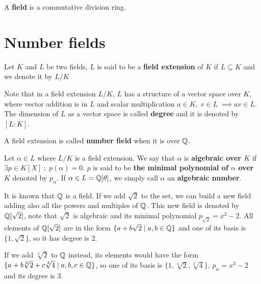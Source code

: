 \documentclass[Ingles]{ic-tese-v3}
\begin{document}
\begin{definition}
  A \textbf{field} is a commutative division ring.
\end{definition}

\section{Number  fields}
\label{sec:orgd6953d3}

   \begin{definition}
  Let $K$ and $L$ be two fields, $L$ is said to be a \textbf{field extension} of
  $K$ if $L \subseteq K$ and we denote it by $L/K$
\end{definition}

Note that in a field extension \(L/K\), \(L\) has a structure of a vector space over
\(K\), where vector addition is in \(L\) and scalar multiplication \(a \in K, \; v \in L
   \; \implies av \in L\). The dimension of \(L\) as a vector space is called
\textbf{degree} and it is denoted by \([L:K]\).

\begin{definition}
  A field extension is called \textbf{number field} when it is over $\mathbb{Q}$.
\end{definition}

\begin{definition}
  Let $\alpha \in L$ where $L/K$ is a field extension. We say that $\alpha$ is
  \textbf{algebraic over $K$} if $\exists p \in K[X] \;;\; p(\alpha) = 0$. $p$ is said to be
  \textbf{the minimal polynomial of $\alpha$ over $K$} denoted by $p_\alpha$. If $\alpha \in L =
  \mathbb{Q}[\theta]$, we simply call $\alpha$ an \textbf{algebraic number}.
\end{definition}

\begin{example}
  It is known that $\mathbb{Q}$ is a field. If we add $\sqrt{2}$ to the set, we
  can build a new field adding also all the powers and multiples of
  $\mathbb{Q}$. This new field is denoted by $\mathbb{Q}[\sqrt{2}]$, note that
  $\sqrt{2}$ is algebraic and its minimal polynomial $p_{\sqrt{2}} = x^2-2$. All
  elements of $\mathbb{Q}[\sqrt{2}]$ are in the form $\{a+b\sqrt{2} \;|\; a,b \in
  \mathbb{Q}\}$ and one of its basis is $\{1, \sqrt{2}\}$, so it has degree is
  $2$.
\end{example}

\begin{example}
  If we add $\sqrt[3]{2}$ to $\mathbb{Q}$ instead, its elements would have the
  form $\{a + b\sqrt[3]{2} + c\sqrt[3]{4} \;|\; a,b,c \in \mathbb{Q}\}$, so one of
  its basis is $\{1 ,\sqrt[3]{2} ,\sqrt[3]{4}\}$, $p_\alpha = x^3 - 2$ and its degree
  is $3$.
\end{example}
\end{document}
